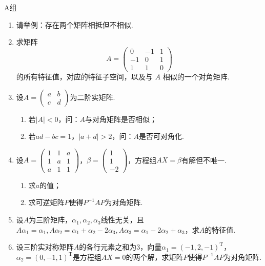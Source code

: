 \centerline{\heiti A组}
\begin{enumerate}
    \item 请举例：存在两个矩阵相抵但不相似.

    \item 求矩阵
          \[A = \begin{pmatrix}
                  0  & -1 & 1 \\
                  -1 & 0  & 1 \\
                  1  & 1  & 0
              \end{pmatrix}\]
          的所有特征值，对应的特征子空间，以及与 $A$ 相似的一个对角矩阵.

    \item 设$A=\begin{pmatrix}
                  a & b \\ c & d
              \end{pmatrix}$为二阶实矩阵.
          \begin{enumerate}
              \item 若$|A|<0$，问：$A$与对角矩阵是否相似；

              \item 若$ad-bc=1$，$|a+d|>2$，问：$A$是否可对角化.
          \end{enumerate}

    \item 设$A=\begin{pmatrix}
                  1 & 1 & a \\
                  1 & a & 1 \\
                  a & 1 & 1
              \end{pmatrix}$，$\beta=\begin{pmatrix}
                  1 \\ 1 \\ -2
              \end{pmatrix}$，方程组$AX=\beta$有解但不唯一.
          \begin{enumerate}
              \item 求$a$的值；

              \item 求可逆矩阵$P$使得$P^{-1}AP$为对角矩阵.
          \end{enumerate}

    \item 设$A$为三阶矩阵，$\alpha_1,\alpha_2,\alpha_3$线性无关，且$A\alpha_1=\alpha_1,A\alpha_2=\alpha_1+\alpha_2-2\alpha_3,A\alpha_3=\alpha_1-2\alpha_2+\alpha_3$，求$A$的特征值.

    \item 设三阶实对称矩阵$A$的各行元素之和为3，向量$\alpha_1=(-1,2,-1)^\mathrm{T}$，$\alpha_2=(0,-1,1)^\mathrm{T}$是方程组$AX=0$的两个解，求矩阵$P$使得$P^{-1}AP$为对角矩阵.
\end{enumerate}

